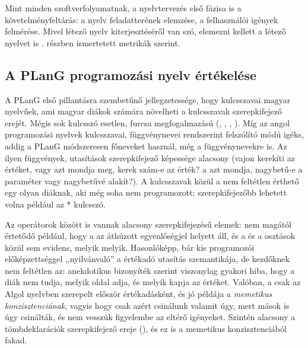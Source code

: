 
Mint minden szoftverfolyamatnak, a nyelvtervezés első fázisa is a követelményfeltárás: a nyelv feladatterének elemzése, a felhasználói igények felmérése.
Mivel létező nyelv kiterjesztéséről van szó, elemezni kellett a létező nyelvet is . részben ismertetett metrikák szerint.

\subsection{A PLanG programozási nyelv értékelése}
A PLanG első pillantásra szembetűnő jellegzetessége, hogy kulcsszavai magyar nyelvűek, ami magyar diákok számára növelheti a kulcsszavak szerepkifejező erejét.
Mégis sok kulcsszó esetlen, furcsa megfogalmazású (, , , ).
Míg az angol programozási nyelvek kulcsszavai, függvénynevei rendszerint felszólító módú igéks, addig a PLanG módszeresen főneveket használ, még a függvénynevekre is.
Az ilyen függvények, utasítások szerepkifejező képessége alacsony (vajon  kerekíti az értéket, vagy azt mondja meg, kerek szám-e az érték? a  azt mondja, nagybetű-e a paraméter vagy nagybetűvé alakít?).
A kulcsszavak közül a  nem feltétlen érthető egy olyan diáknak, aki még soha nem programozott; szerepkifejezőbb lehetett volna például az * kulcsszó.

Az operátorok között is vannak alacsony szerepkifejezésű elemek: nem magától értetődő például, hogy a \plang{/=} az áthúzott egyenlőségjel helyett áll, és a  és a \plang{/} osztások közül sem evidens, melyik melyik.
Hasonlóképp, bár kis programozói előképzettséggel ,,nyilvánvaló'' a \plang{:=} értékadó utasítás szemantikája, de kezdőknek nem feltétlen az: anekdotikus bizonyíték szerint viszonylag gyakori hiba, hogy a diák nem tudja, melyik oldal adja, és melyik kapja az értéket.
Valóban, a \plang{:=} csak az Algol nyelvben szerepelt először értékadásként, és jó példája a \textit{memetikus konzisztenciának}, vagyis hogy csak azért csinálunk valamit úgy, mert mások is úgy csinálták, és nem vesszük figyelembe az eltérő igényeket\cite{McIver01}.
Szintén alacsony a tömbdeklarációk szerepkifejező ereje (), és ez is a memetikus konzisztenciából fakad.

